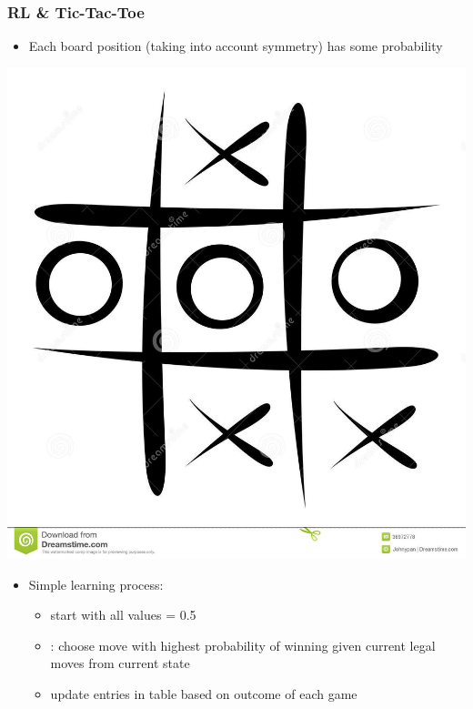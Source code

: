 \documentclass[handout]{beamer}
\begin{document}
\begin{frame}\frametitle{RL \& Tic-Tac-Toe}\small
\begin{itemize}
\item Each board position (taking into account symmetry) has some probability
\end{itemize}
\begin{minipage}{4cm}
\begin{center}
\includegraphics[width=1.0\linewidth]{Figures/tictac} 
\end{center}
\end{minipage}
\begin{minipage}{7cm}
\begin{itemize}
\item Simple learning process: 
\begin{itemize}
\item start with all values = 0.5
\item {}: choose move with highest probability of winning given current legal moves from current state
\item update entries in table based on outcome of each game

\end{itemize}
\end{itemize}
\end{minipage}
\end{frame}
\end{document}
